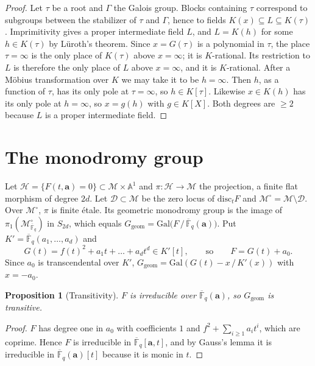 \documentclass[11pt,a4paper]{article}
\newtheorem{proposition}[theorem]{Proposition}
\theoremstyle{definition}
\theoremstyle{remark}
\newcommand{\Fqbar}{\overline{\mathbb{F}}_q}
\newcommand{\A}{\mathbb{A}}
\newcommand{\Gal}{\mathrm{Gal}}
\newcommand{\disc}{\mathrm{disc}}
\newcommand{\Ggeom}{G_{\mathrm{geom}}}
\newcommand{\cM}{\mathcal{M}}
\newcommand{\cH}{\mathcal{H}}
\newcommand{\ba}{\mathbf{a}}
\begin{document}
\begin{proof}
Let $\tau$ be a root and $\Gamma$ the Galois group. Blocks containing $\tau$
correspond to subgroups between the stabilizer of $\tau$ and $\Gamma$, hence
to fields $K(x)\subseteq L\subseteq K(\tau)$. Imprimitivity gives a proper
intermediate field $L$, and $L=K(h)$ for some $h\in K(\tau)$ by L\"uroth's theorem.
Since $x=G(\tau)$ is a polynomial in $\tau$, the place $\tau=\infty$ is the only
place of $K(\tau)$ above $x=\infty$; it is $K$-rational. Its restriction to $L$ is
therefore the only place of $L$ above $x=\infty$, and it is $K$-rational.
After a M\"obius transformation over $K$ we may take it to be $h=\infty$.
Then $h$, as a function of $\tau$, has its only pole at $\tau=\infty$, so $h\in K[\tau]$.
Likewise $x\in K(h)$ has its only pole at $h=\infty$, so $x=g(h)$ with $g\in K[X]$.
Both degrees are $\ge2$ because $L$ is a proper intermediate field.
\end{proof}

\section{The monodromy group}\label{sec:monodromy}

Let $\cH=\{F(t,\ba)=0\}\subset\cM\times\A^1$ and $\pi:\cH\to\cM$ the
projection, a finite flat morphism of degree $2d$. Let
$\mathcal D\subset\cM$ be the zero locus of $\disc_t F$ and $\cM^\circ=\cM\setminus\mathcal D$.
Over $\cM^\circ$, $\pi$ is finite \'etale. Its geometric monodromy group is the
image of $\pi_1(\cM^\circ_{\Fqbar})$ in $S_{2d}$, which equals
$\Ggeom=\Gal\bigl(F\,/\,\Fqbar(\ba)\bigr)$.
Put $K'=\Fqbar(a_1,\dots,a_d)$ and
\[
  G(t)=f(t)^2+a_1t+\dots+a_dt^d\in K'[t],\qquad\text{so}\qquad F=G(t)+a_0 .
\]
Since $a_0$ is transcendental over $K'$, $\Ggeom=\Gal(G(t)-x\,/\,K'(x))$ with $x=-a_0$.

\begin{proposition}[Transitivity]\label{prop:irred}
$F$ is irreducible over $\Fqbar(\ba)$, so $\Ggeom$ is transitive.
\end{proposition}
\begin{proof}
$F$ has degree one in $a_0$ with coefficients $1$ and $f^2+\sum_{i\ge1}a_it^i$,
which are coprime. Hence $F$ is irreducible in $\Fqbar[\ba,t]$, and by Gauss's
lemma it is irreducible in $\Fqbar(\ba)[t]$ because it is monic in $t$.
\end{proof}
\end{document}
